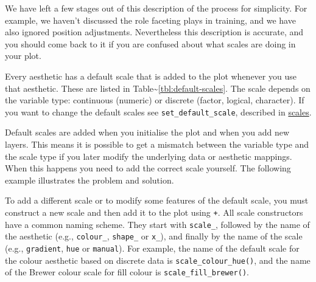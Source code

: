 We have left a few stages out of this description of the process for
simplicity. For example, we haven't discussed the role faceting plays in
training, and we have also ignored position adjustments. Nevertheless
this description is accurate, and you should come back to it if you are
confused about what scales are doing in your plot.


Every aesthetic has a default scale that is added to the plot whenever
you use that aesthetic. These are listed in
Table\textasciitilde{}\ref{tbl:default-scales}. The scale depends on the
variable type: continuous (numeric) or discrete (factor, logical,
character). If you want to change the default scales see
\texttt{set\_default\_scale}, described in
\hyperref[sub:customise-scales]{scales}.

Default scales are added when you initialise the plot and when you add
new layers. This means it is possible to get a mismatch between the
variable type and the scale type if you later modify the underlying data
or aesthetic mappings. When this happens you need to add the correct
scale yourself. The following example illustrates the problem and
solution. 

\begin{Shaded}
\begin{Highlighting}[]
\StringTok{ } 

\StringTok{ }\NormalTok{(} 

\StringTok{ }\NormalTok{(} \StringTok{ }\NormalTok{()}
\end{Highlighting}
\end{Shaded}

To add a different scale or to modify some features of the default
scale, you must construct a new scale and then add it to the plot using
\texttt{+}. \indexc{+} All scale constructors have a common naming
scheme. They start with \texttt{scale\_}, followed by the name of the
aesthetic (e.g., \texttt{colour\_}, \texttt{shape\_} or \texttt{x\_}),
and finally by the name of the scale (e.g., \texttt{gradient},
\texttt{hue} or \texttt{manual}). For example, the name of the default
scale for the colour aesthetic based on discrete data is
\texttt{scale\_colour\_hue()}, and the name of the Brewer colour scale
for fill colour is \texttt{scale\_fill\_brewer()}. 

